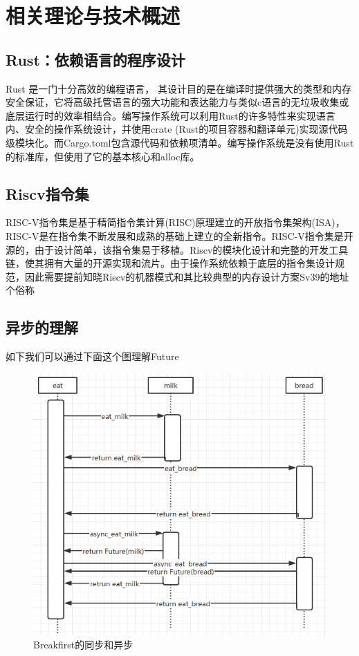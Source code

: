 \chapter{相关理论与技术概述}
\label{chap:knowledge}

\section{Rust：依赖语言的程序设计}

Rust 是一门十分高效的编程语言， 其设计目的是在编译时提供强大的类型和内存安全保证，它将高级托管语言的强大功能和表达能力与类似c语言的无垃圾收集或底层运行时的效率相结合。编写操作系统可以利用Rust的许多特性来实现语言内、安全的操作系统设计，并使用crate (Rust的项目容器和翻译单元)实现源代码级模块化。而Cargo.toml包含源代码和依赖项清单。编写操作系统是没有使用Rust的标准库，但使用了它的基本核心和alloc库。

\section{Riscv指令集}

RISC-V指令集是基于精简指令集计算(RISC)原理建立的开放指令集架构(ISA)，RISC-V是在指令集不断发展和成熟的基础上建立的全新指令。RISC-V指令集是开源的，由于设计简单，该指令集易于移植。Riscv的模块化设计和完整的开发工具链，使其拥有大量的开源实现和流片。由于操作系统依赖于底层的指令集设计规范，因此需要提前知晓Riscv的机器模式和其比较典型的内存设计方案Sv39的地址个俗称

\section{异步的理解}

如下我们可以通过下面这个图理解Future

\begin{figure}[htb]
    \figureCapSet
    \centering
    \includegraphics[width=.8\linewidth]{figure/c2/breakfirstsequence.png}
    \caption{Breakfirst的同步和异步}
    \label{figure:c2breakfirstsequence}
\end{figure}

